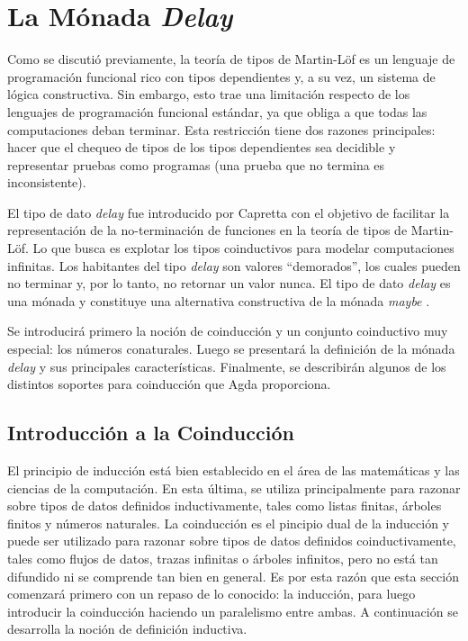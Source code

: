 \chapter{La Mónada \textit{Delay}}\label{chapter:delay}

Como se discutió previamente, la teoría de tipos de Martin-Löf es un lenguaje de programación funcional rico con tipos dependientes y, a su vez, un sistema de lógica constructiva. Sin embargo, esto trae una limitación respecto de los lenguajes de programación funcional estándar, ya que obliga a que todas las computaciones deban terminar. Esta restricción tiene dos razones principales: hacer que el chequeo de tipos de los tipos dependientes sea decidible y representar pruebas como programas (una prueba que no termina es inconsistente). 

El tipo de dato \textit{delay} fue introducido por Capretta \cite{capretta:2005} con el objetivo de facilitar la representación de la no-terminación de funciones en la teoría de tipos de Martin-Löf. Lo que busca es explotar los tipos coinductivos para modelar computaciones infinitas. Los habitantes del tipo \textit{delay} son valores ``demorados'', los cuales pueden no terminar y, por lo tanto, no retornar un valor nunca. El tipo de dato \textit{delay} es una mónada y constituye una alternativa constructiva de la mónada \textit{maybe} \cite[\S 3]{capretta:2005}. 

Se introducirá primero la noción de coinducción y un conjunto coinductivo muy especial: los números conaturales. Luego se presentará la definición de la mónada \textit{delay} y sus principales características. Finalmente, se describirán algunos de los distintos soportes para coinducción que Agda proporciona. 

\section{Introducción a la Coinducción}\label{delay:coind}

El principio de inducción está bien establecido en el área de las matemáticas y las ciencias de la computación. En esta última, se utiliza principalmente para razonar sobre tipos de datos definidos inductivamente, tales como listas finitas, árboles finitos y números naturales. La coinducción es el pincipio dual de la inducción y puede ser utilizado para razonar sobre tipos de datos definidos coinductivamente, tales como flujos de datos, trazas infinitas o árboles infinitos, pero no está tan difundido ni se comprende tan bien en general. Es por esta razón que esta sección comenzará primero con un repaso de lo conocido: la inducción, para luego introducir la coinducción haciendo un paralelismo entre ambas. A continuación se desarrolla la noción de definición inductiva. 

